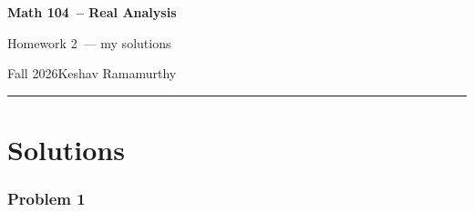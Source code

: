 \documentclass[11pt]{article}
\newcommand{\studentname}{Keshav Ramamurthy}
\newcommand{\coursename}{Math 104}
\newcommand{\courselongname}{Real Analysis}
\newcommand{\assignment}{Homework 2}
\newcommand{\term}{Fall 2026}
\newcommand{\1}{\mathbf{1}}
\theoremstyle{definition}
\begin{document}
\begin{center}
  {\Large\sffamily\bfseries \coursename\ -- \courselongname}\par\vspace{3pt}
  {\sffamily \assignment\ — my solutions}\par\vspace{3pt}
  {\small\sffamily \term\quad\textbullet\quad \studentname}
\end{center}
\medskip
\hrule
\bigskip


\clearpage

\section*{Solutions}
\subsubsection*{Problem 1}
\end{document}
